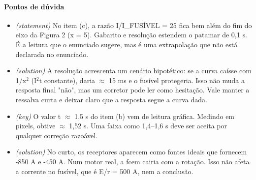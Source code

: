 \documentclass{article}%
\begin{document}
\paragraph{Pontos de dúvida}%
\begin{itemize}%
\item%
\textit{(statement)} No item (c), a razão I/I\_FUSÍVEL = 25 fica bem além do fim do eixo da Figura 2 (x = 5). Gabarito e resolução estendem o patamar de 0,1 s. É a leitura que o enunciado sugere, mas é uma extrapolação que não está declarada no enunciado.%
\item%
\textit{(solution)} A resolução acrescenta um cenário hipotético: se a curva caísse com 1/x$^2$ (I$^2$t constante), daria $\approx$ 15 ms e o fusível protegeria. Isso não muda a resposta final "não", mas um corretor pode ler como hesitação. Vale manter a ressalva curta e deixar claro que a resposta segue a curva dada.%
\item%
\textit{(key)} O valor t $\approx$ 1,5 s do item (b) vem de leitura gráfica. Medindo em pixels, obtive $\approx$ 1,52 s. Uma faixa como 1,4--1,6 s deve ser aceita por qualquer correção razoável.%
\item%
\textit{(solution)} No curto, os receptores aparecem como fontes ideais que fornecem -850 A e -450 A. Num motor real, a fcem cairia com a rotação. Isso não afeta a corrente no fusível, que é E/r = 500 A, nem a conclusão.%
\end{itemize}%
\end{document}

